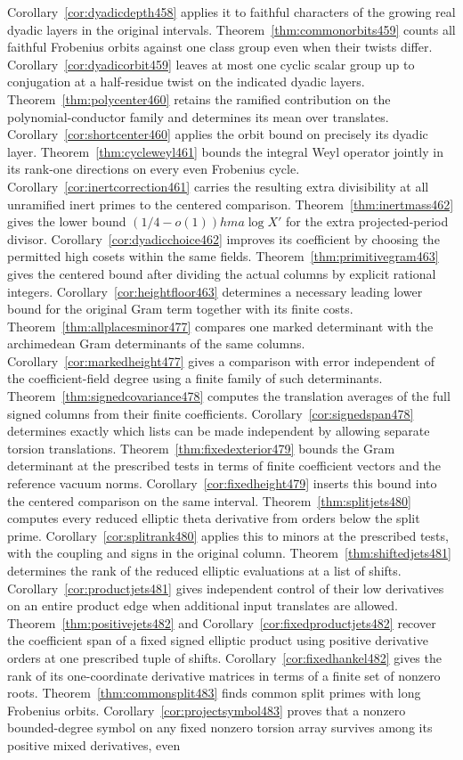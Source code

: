 \documentclass[a4paper,11pt]{article}
\theoremstyle{definition}
\theoremstyle{remark}
\numberwithin{equation}{section}
\begin{document}
Corollary~\ref{cor:dyadicdepth458} applies it to faithful characters of the growing real dyadic layers in the original intervals. Theorem~\ref{thm:commonorbits459} counts all faithful Frobenius orbits against one class group even when their twists differ. Corollary~\ref{cor:dyadicorbit459} leaves at most one cyclic scalar group up to conjugation at a half-residue twist on the indicated dyadic layers. Theorem~\ref{thm:polycenter460} retains the ramified contribution on the polynomial-conductor family and determines its mean over translates. Corollary~\ref{cor:shortcenter460} applies the orbit bound on precisely its dyadic layer. Theorem~\ref{thm:cycleweyl461} bounds the integral Weyl operator jointly in its rank-one directions on every even Frobenius cycle. Corollary~\ref{cor:inertcorrection461} carries the resulting extra divisibility at all unramified inert primes to the centered comparison. Theorem~\ref{thm:inertmass462} gives the lower bound \((1/4-o(1))hma\log X'\) for the extra projected-period divisor. Corollary~\ref{cor:dyadicchoice462} improves its coefficient by choosing the permitted high cosets within the same fields. Theorem~\ref{thm:primitivegram463} gives the centered bound after dividing the actual columns by explicit rational integers. Corollary~\ref{cor:heightfloor463} determines a necessary leading lower bound for the original Gram term together with its finite costs. Theorem~\ref{thm:allplacesminor477} compares one marked determinant with the archimedean Gram determinants of the same columns. Corollary~\ref{cor:markedheight477} gives a comparison with error independent of the coefficient-field degree using a finite family of such determinants. Theorem~\ref{thm:signedcovariance478} computes the translation averages of the full signed columns from their finite coefficients. Corollary~\ref{cor:signedspan478} determines exactly which lists can be made independent by allowing separate torsion translations. Theorem~\ref{thm:fixedexterior479} bounds the Gram determinant at the prescribed tests in terms of finite coefficient vectors and the reference vacuum norms. Corollary~\ref{cor:fixedheight479} inserts this bound into the centered comparison on the same interval. Theorem~\ref{thm:splitjets480} computes every reduced elliptic theta derivative from orders below the split prime. Corollary~\ref{cor:splitrank480} applies this to minors at the prescribed tests, with the coupling and signs in the original column. Theorem~\ref{thm:shiftedjets481} determines the rank of the reduced elliptic evaluations at a list of shifts. Corollary~\ref{cor:productjets481} gives independent control of their low derivatives on an entire product edge when additional input translates are allowed. Theorem~\ref{thm:positivejets482} and Corollary~\ref{cor:fixedproductjets482} recover the coefficient span of a fixed signed elliptic product using positive derivative orders at one prescribed tuple of shifts. Corollary~\ref{cor:fixedhankel482} gives the rank of its one-coordinate derivative matrices in terms of a finite set of nonzero roots. Theorem~\ref{thm:commonsplit483} finds common split primes with long Frobenius orbits. Corollary~\ref{cor:projectsymbol483} proves that a nonzero bounded-degree symbol on any fixed nonzero torsion array survives among its positive mixed derivatives, even 
\end{document}
